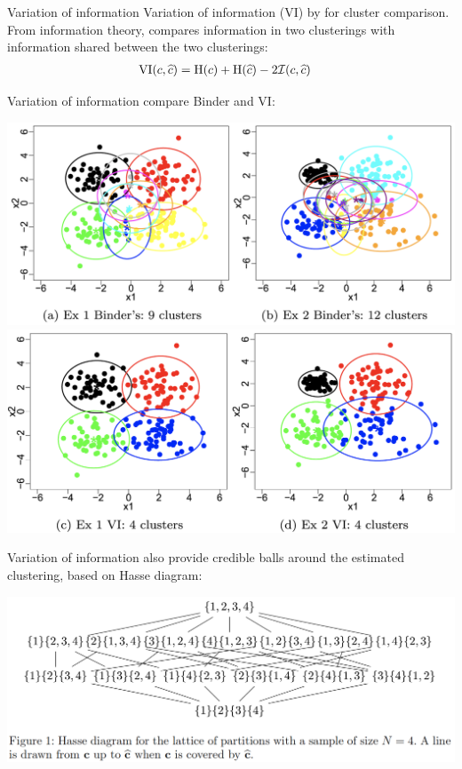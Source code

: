 \begin{frame}{Variation of information}
\alert{Variation of information} (VI) by \citet{meila2007comparing} for cluster comparison. From information theory, compares information in two clusterings with information shared between the two clusterings:
\begin{align*}
&\text{VI}(c,\widehat{c})=\text{H}(c)+\text{H}(\widehat{c})-2\mathcal{I}(c,\widehat{c})
\end{align*}
\end{frame}


\begin{frame}{Variation of information}
\citet{wade2018bayesian} 
compare Binder and VI:\bigskip

\begin{center}
\includegraphics[width=.7\textwidth]{figures_julyan/mixtures/wade_example_binder}
\includegraphics[width=.7\textwidth]{figures_julyan/mixtures/wade_example_VI}	
\end{center}
\end{frame}


\begin{frame}{Variation of information}
\citet{wade2018bayesian} 
also provide \alert{credible balls} around the estimated clustering, based on Hasse diagram:\bigskip

\includegraphics[width=\textwidth]{figures_julyan/mixtures/hasse_diagram}
\end{frame}